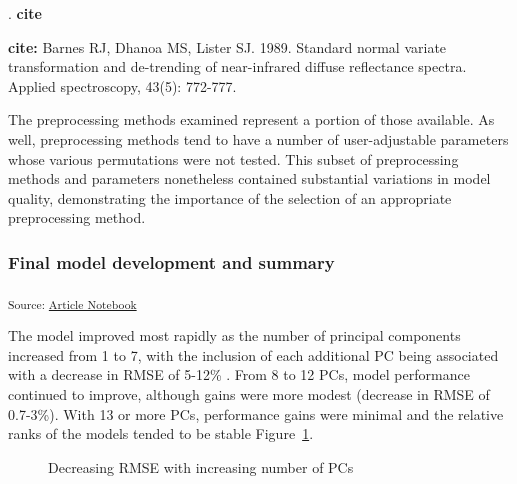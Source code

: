 \documentclass[
]{agujournal2019}
\begin{document}
\ring. \textbf{cite}

\textbf{cite:} Barnes RJ, Dhanoa MS, Lister SJ. 1989. Standard normal
variate transformation and de-trending of near-infrared diffuse
reflectance spectra. Applied spectroscopy, 43(5): 772-777.

The preprocessing methods examined represent a portion of those
available. As well, preprocessing methods tend to have a number of
user-adjustable parameters whose various permutations were not tested.
This subset of preprocessing methods and parameters nonetheless
contained substantial variations in model quality, demonstrating the
importance of the selection of an appropriate preprocessing method.

\subsubsection{Final model development and
summary}\label{final-model-development-and-summary}

\textsubscript{Source:
\href{https://rvcrawford.github.io/glowing-system/index.qmd.html}{Article
Notebook}}

The model improved most rapidly as the number of principal components
increased from 1 to 7, with the inclusion of each additional PC being
associated with a decrease in RMSE of 5-12\% . From 8 to 12 PCs, model
performance continued to improve, although gains were more modest
(decrease in RMSE of 0.7-3\%). With 13 or more PCs, performance gains
were minimal and the relative ranks of the models tended to be stable
Figure~\ref{fig-model-calibration}.

\label{cell-fig-model-calibration}
\begin{figure}[H]


\caption{\label{fig-model-calibration}Decreasing RMSE with increasing
number of PCs}

\end{figure}%
\end{document}
